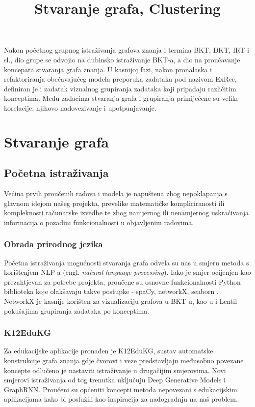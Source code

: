 \title{Stvaranje grafa, Clustering}
\maketitle
Nakon početnog grupnog istraživanja grafova znanja i termina BKT, DKT, IRT i sl., dio grupe se odvojio na dubinsko istraživanje BKT-a, a dio na proučavanje koncepata stvaranja grafa znanja. U kasnijoj fazi, nakon pronalaska i refaktoriranja obećavajućeg modela preporuka zadataka pod nazivom ExRec, definiran je i zadatak vizualnog grupiranja zadataka koji pripadaju različitim konceptima. Među zadacima stvaranja grafa i grupiranja primijećene su velike korelacije; njihovo nadovezivanje i upotpunjavanje.

\chapter{Stvaranje grafa}
\section{Početna istraživanja}
Većina prvih proučenih radova i modela je napuštena zbog nepoklapanja s glavnom idejom našeg projekta, prevelike matematičke kompliciranosti ili kompleknosti računarske izvedbe te zbog namjernog ili nenamjernog uskraćivanja informacija o pozadini funkcionalnosti u objavljenim radovima.\newline
\newline
\subsection{Obrada prirodnog jezika}
Početna istraživanja mogućnosti stvaranja grafa odvela su nas u smjeru metoda s korištenjem NLP-a (engl. \textit{natural language processing}). Iako je smjer ocijenjen kao prezahtjevan za potrebe projekta, proučene su osnovne funkcionalnosti Python biblioteka koje olakšavaju takve postupke - spaCy, networkX, seaborn \citep{spacy}. NetworkX je kasnije korišten za vizualizaciju grafova u BKT-u, kao u i Lentil pokušajima grupiranja zadataka po konceptima.\newline
\newline
\subsection{K12EduKG}
Za edukacijske aplikacije pronađen je K12EduKG, sustav automatske konstrukcije grafa znanja gdje čvorovi i veze predstavljaju međusobno povezane koncepte \citep{k12} odlučeno je nastaviti istraživanje u drugačijim smjerovima.\newline
\newline
Novi smjerovi istraživanja od tog trenutka uključuju Deep Generative Models i GraphRNN. Proučeni su općeniti koncepti metoda nepovezani s edukacijskim aplikacijama kako bi poslužili kao inspiracija za nadogradnju na naš problem.\newline
\newline
